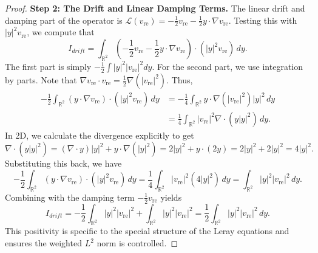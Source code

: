 \documentclass[12pt]{amsart}
\numberwithin{equation}{section}              %
\theoremstyle{remark}
\begin{document}
\begin{proof}
			
			\textbf{Step 2: The Drift and Linear Damping Terms.}
			The linear drift and  damping part of the operator is $\mathcal{L}(v_{\text{re}}) = -\frac{1}{2}v_{\text{re}} - \frac{1}{2} y \cdot \nabla v_{\text{re}}$. Testing this with $|y|^2 v_{\text{re}}$, we compute that
			\begin{equation}
				I_{drift} = \int_{\mathbb{R}^2} \left( -\frac{1}{2} v_{\text{re}} - \frac{1}{2} y \cdot \nabla v_{\text{re}} \right) \cdot (|y|^2 v_{\text{re}}) \, dy.
			\end{equation}
			The first part is simply $-\frac{1}{2} \int |y|^2 |v_{\text{re}}|^2 dy$. For the second part, we use integration by parts. Note that $\nabla v_{\text{re}} \cdot v_{\text{re}} = \frac{1}{2} \nabla (|v_{\text{re}}|^2)$. Thus,
			\begin{align*}
				-\frac{1}{2} \int_{\mathbb{R}^2} (y \cdot \nabla v_{\text{re}}) \cdot (|y|^2 v_{\text{re}}) \, dy 
				&= -\frac{1}{4} \int_{\mathbb{R}^2} y \cdot \nabla (|v_{\text{re}}|^2) |y|^2 \, dy \\
				&= \frac{1}{4} \int_{\mathbb{R}^2} |v_{\text{re}}|^2 \nabla \cdot (y |y|^2) \, dy.
			\end{align*}
			In 2D, we calculate the divergence explicitly to get
			\begin{equation*}
			\nabla \cdot (y |y|^2) = (\nabla \cdot y)|y|^2 + y \cdot \nabla(|y|^2) = 2|y|^2 + y \cdot (2y) = 2|y|^2 + 2|y|^2 = 4|y|^2.    
			\end{equation*}
			Substituting this back, we have
			\begin{equation*}
			    -\frac{1}{2} \int_{\mathbb{R}^2} (y \cdot \nabla v_{\text{re}}) \cdot (|y|^2 v_{\text{re}}) \, dy = \frac{1}{4} \int_{\mathbb{R}^2} |v_{\text{re}}|^2 (4|y|^2) \, dy = \int_{\mathbb{R}^2} |y|^2 |v_{\text{re}}|^2 \, dy.
			\end{equation*}
			Combining with the damping term $-\frac{1}{2} v_{\text{re}}$ yields
			\begin{equation} \label{eq:drift_coercivity}
				I_{drift} = -\frac{1}{2} \int_{\mathbb{R}^2} |y|^2 |v_{\text{re}}|^2 + \int_{\mathbb{R}^2} |y|^2 |v_{\text{re}}|^2 = \frac{1}{2} \int_{\mathbb{R}^2} |y|^2 |v_{\text{re}}|^2 \, dy.
			\end{equation}
			This positivity is specific to the special structure  of the Leray equations and ensures the weighted $L^2$ norm is controlled.
			
			
		
			
			

\end{proof}
\end{document}
